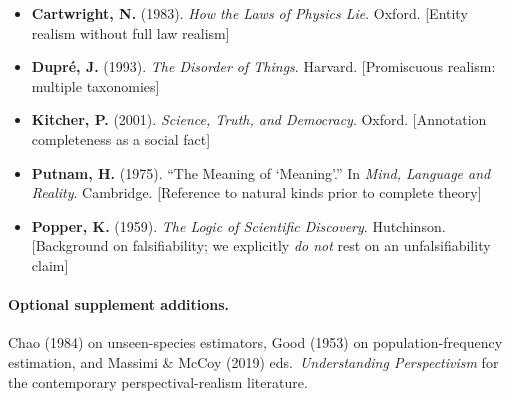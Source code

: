 \begin{itemize}[leftmargin=*]
  \item \textbf{Cartwright, N.} (1983). \emph{How the Laws of Physics Lie}. Oxford. [Entity realism without full law realism]
  \item \textbf{Dupré, J.} (1993). \emph{The Disorder of Things}. Harvard. [Promiscuous realism: multiple taxonomies]
  \item \textbf{Kitcher, P.} (2001). \emph{Science, Truth, and Democracy}. Oxford. [Annotation completeness as a social fact]
  \item \textbf{Putnam, H.} (1975). ``The Meaning of `Meaning'.'' In \emph{Mind, Language and Reality}. Cambridge. [Reference to natural kinds prior to complete theory]
  \item \textbf{Popper, K.} (1959). \emph{The Logic of Scientific Discovery}. Hutchinson. [Background on falsifiability; we explicitly \emph{do not} rest on an unfalsifiability claim]
\end{itemize}

\paragraph*{Optional supplement additions.} Chao (1984) on unseen-species estimators, Good (1953) on population-frequency estimation, and Massimi \& McCoy (2019) eds.~\emph{Understanding Perspectivism} for the contemporary perspectival-realism literature.

